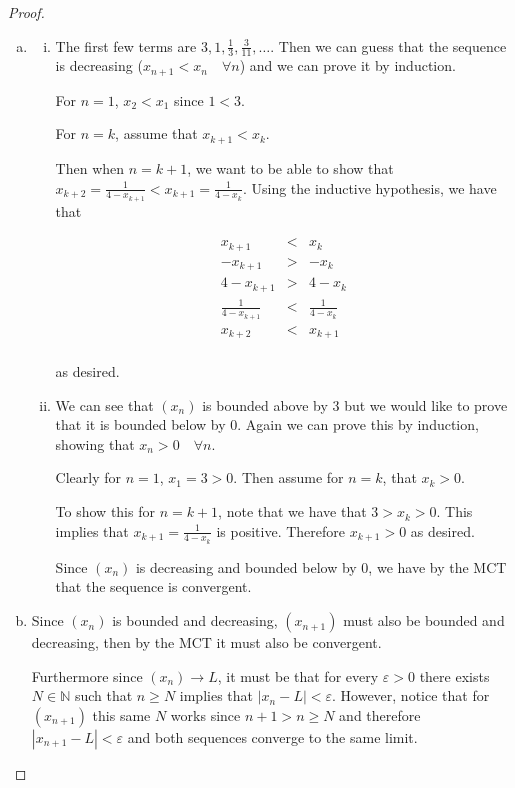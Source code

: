 		\begin{proof}
			\begin{enumerate}[(a)]
				\item  
				\begin{enumerate}[(i)]
					\item The first few terms are $3, 1, \frac{1}{3}, \frac{3}{11}, \ldots$.  Then we can guess that the sequence is decreasing ($x_{n+1}< x_{n} \quad \forall n$)  and we can prove it by induction.
				
				For $n=1$,  $x_{2}< x_{1}$ since $1 <3$.
				
				For $n=k$, assume that $x_{k+1} < x_{k}$.
				
				Then when $n=k+1$, we want to be able to show that $x_{k+2} =\frac{1}{4-x_{k+1}} < x_{k+1} = \frac{1}{4-x_{k}}  $.   Using the inductive hypothesis, we have that
				
				
				\begin{eqnarray*}
x_{k+1}  &< & x_{k} \\
   	-x_{k+1}  &>& -x_{k} \\
 4-x_{k+1}  &>&4 -x_{k}\\
    \frac{1}{4-x_{k+1}}  &<&\frac{1}{4 -x_{k}}\\
   x_{k+2}  &< & x_{k+1} \\
\end{eqnarray*}

as desired.
				\item We can see that $(x_n)$ is bounded above by $3$ but we would like to prove that it is bounded below by $0$.  Again we can prove this by induction, showing that $x_n > 0 \quad \forall n$.
				
				Clearly for $n=1$, $x_1 = 3 >0$.
				Then assume for $n=k$, that $x_k >0$.
				
				To show this for $n = k+1$, note that we have that $3>x_k>0$.  This implies that $x_{k+1} = \frac{1}{4-x_k}$  is positive.  Therefore $x_{k+1}>0$ as desired.
				
				
				Since $(x_n)$ is decreasing and bounded below by $0$, we have by the MCT that the sequence is convergent.
				
								\end{enumerate}
				
				\item Since $ (x_n)$ is bounded and decreasing, $(x_{n+1})$ must also be bounded and decreasing, then by the MCT it must also be convergent.
				
				Furthermore since $(x_n) \to L$, it must be that for every $\varepsilon >0$ there exists $N \in \mathbb{N}$ such that $n \geq N$ implies that $|x_n - L| <\varepsilon$.  However, notice that for $(x_{n+1})$ this same $N$ works since $n+1> n \geq N$ and therefore $|x_{n+1} - L| <\varepsilon$ and both sequences converge to the same limit.
				

\end{enumerate}
\end{proof}
